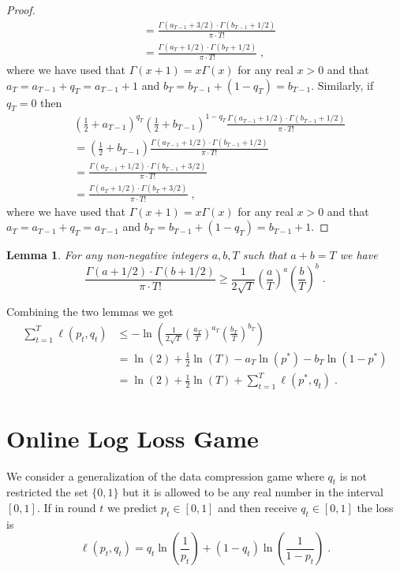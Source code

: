 \documentclass{article}
\newtheorem{lemma}[theorem]{Lemma}
\begin{document}
\begin{proof}
\begin{align*}
& = \frac{\Gamma(a_{T-1} + 3/2) \cdot \Gamma(b_{T-1} + 1/2)}{\pi \cdot T!} \\
& = \frac{\Gamma(a_{T} + 1/2) \cdot \Gamma(b_T + 1/2)}{\pi \cdot T!} \; ,
\end{align*}
where we have used that $\Gamma(x+1) = x \Gamma(x)$ for any real $x > 0$ and that $a_T = a_{T-1} + q_T = a_{T-1} + 1$ and $b_T = b_{T-1} + (1-q_T) = b_{T-1}$.
Similarly, if $q_T = 0$ then
\begin{align*}
& \left( \frac{1}{2} + a_{T-1} \right)^{q_T} \left( \frac{1}{2} + b_{T-1} \right)^{1-q_T} \frac{\Gamma(a_{T-1} + 1/2) \cdot \Gamma(b_{T-1} + 1/2)}{\pi \cdot T!} \\
& = \left( \frac{1}{2} + b_{T-1} \right) \frac{\Gamma(a_{T-1} + 1/2) \cdot \Gamma(b_{T-1} + 1/2)}{\pi \cdot T!} \\
& = \frac{\Gamma(a_{T-1} + 1/2) \cdot \Gamma(b_{T-1} + 3/2)}{\pi \cdot T!} \\
& = \frac{\Gamma(a_T + 1/2) \cdot \Gamma(b_T + 3/2)}{\pi \cdot T!} \; ,
\end{align*}
where we have used that $\Gamma(x+1) = x \Gamma(x)$ for any real $x > 0$ and that $a_T = a_{T-1} + q_T = a_{T-1}$ and $b_T = b_{T-1} + (1-q_T) = b_{T-1} + 1$.
\end{proof}

\begin{lemma}
For any non-negative integers $a, b,T$ such that $a + b = T$ we have
$$
\frac{\Gamma(a + 1/2) \cdot \Gamma(b + 1/2)}{\pi \cdot T!} \ge \frac{1}{2\sqrt{T}} \left( \frac{a}{T} \right)^a \left( \frac{b}{T} \right)^b \; .
$$
\end{lemma}

Combining the two lemmas we get
\begin{align*}
\sum_{t=1}^T \ell(p_t, q_t)
& \le - \ln \left( \frac{1}{2\sqrt{T}} \left( \frac{a_T}{T} \right)^{a_T} \left( \frac{b_T}{T} \right)^{b_T} \right) \\
& = \ln(2) + \frac{1}{2} \ln(T) - a_T \ln (p^*) - b_T \ln (1-p^*) \\
& = \ln(2) + \frac{1}{2} \ln(T) + \sum_{t=1}^T \ell(p^*, q_t) \; .
\end{align*}

\section{Online Log Loss Game}
\label{section:log-loss}

We consider a generalization of the data compression game where $q_t$ is not restricted
the set $\{0,1\}$ but it is allowed to be any real number in the interval $[0,1]$.
If in round $t$ we predict $p_t \in [0,1]$ and then receive $q_t \in [0,1]$ the loss is
$$
\ell(p_t, q_t) = q_t \ln\left( \frac{1}{p_t}\right) + (1-q_t) \ln  \left( \frac{1}{1 - p_t} \right) \; .
$$
\end{document}
